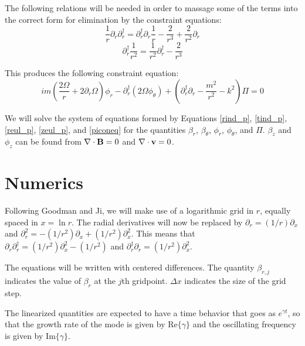 \documentclass[letterpaper]{article}
\begin{document}
The following relations will be needed in order to massage some of the terms into the correct form for elimination by the constraint equations:
\begin{equation}
\frac{1}{r}\partial_r \partial_r^\dagger = \partial_r^\dagger \partial_r \frac{1}{r} - \frac{2}{r^3} + \frac{2}{r^2}\partial_r
\end{equation}
\begin{equation}
\partial_r^\dagger \frac{1}{r^2} = \frac{1}{r^2} \partial_r^\dagger - \frac{2}{r^3}
\end{equation}

This produces the following constraint equation:
\begin{equation}\label{piconeq}
im\left(\frac{2\Omega}{r}+2\partial_r \Omega\right)\phi_r - \partial_r^\dagger\left(2\Omega\phi_\theta\right)+\left(\partial_r^\dagger \partial_r - \frac{m^2}{r^2}-k^2\right)\Pi = 0
\end{equation}

We will solve the system of equations formed by Equations \ref{rind_p}, \ref{tind_p}, \ref{reul_p}, \ref{zeul_p}, and \ref{piconeq} for the quantities $\beta_r$, $\beta_\theta$, $\phi_r$, $\phi_\theta$, and $\Pi$.  $\beta_z$ and $\phi_z$ can be found from $\nabla\cdot{\bf B}=0$ and $\nabla\cdot{\bf v}=0$.
\section{Numerics}

Following Goodman and Ji, we will make use of a logarithmic grid in $r$, equally spaced in $x=\ln{r}$.  The radial derivatives will now be replaced by $\partial_r = (1/r)\partial_x$ and $\partial_r^2 = -(1/r^2)\partial_x + (1/r^2)\partial_x^2$.  This means that $\partial_r \partial_r^\dagger = (1/r^2)\partial_x^2 - (1/r^2)$ and $\partial_r^\dagger \partial_r = (1/r^2)\partial_x^2$.

The equations will be written with centered differences.  The quantity $\beta_{r,j}$ indicates the value of $\beta_r$ at the $j$th gridpoint. $\Delta x$ indicates the size of the grid step.

The linearized quantities are expected to have a time behavior that goes as $e^{\gamma t}$, so that the growth rate of the mode is given by $\mathrm{Re}\{\gamma\}$ and the oscillating frequency is given by $\mathrm{Im}\{\gamma\}$.
\end{document}
